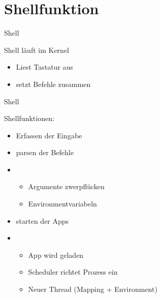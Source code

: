 \section{Shellfunktion}


\begin{frame}{Shell}
    \begin{Large}
        Shell läuft im Kernel
    \end{Large}
    \vspace{15pt}

    \begin{itemize}
        \item Liest Tastatur aus
        \item setzt Befehle zusammen
    \end{itemize}
    
\end{frame}


\begin{frame}{Shell}
    \begin{Large}
        Shellfunktionen: 
    \end{Large}
    \vspace{15pt} 
    
    \begin{itemize}
        \item Erfassen der Eingabe
        \item parsen der Befehle
        \item [] \begin{itemize}
            \item Argumente zwerpflücken
            \item Environmentvariabeln
        \end{itemize}
        \item starten der Apps
        \item [] \begin{itemize}
            \item App wird geladen
            \item Scheduler richtet Prozess ein
            \item Neuer Thread (Mapping + Environment)
        \end{itemize}
    \end{itemize}
\end{frame}


